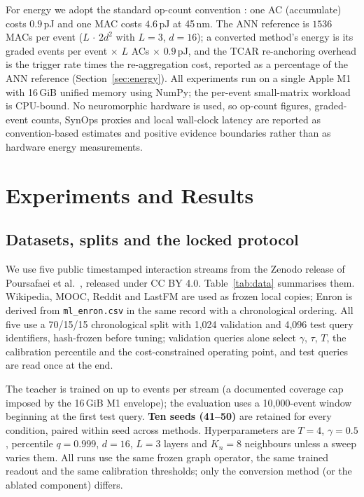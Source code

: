 \documentclass[preprint,12pt]{elsarticle}
\begin{document}
For energy we adopt the standard op-count convention \cite{horowitz2014,zhang2025sgnnbench}: one AC (accumulate) costs $0.9$\,pJ and one MAC costs $4.6$\,pJ at 45\,nm. The ANN reference is $1536$ MACs per event ($L\,{\cdot}\,2d^2$ with $L{=}3$, $d{=}16$); a converted method's energy is its graded events per event $\times$ $L$ ACs $\times$ $0.9$\,pJ, and the TCAR re-anchoring overhead is the trigger rate times the re-aggregation cost, reported as a percentage of the ANN reference (Section~\ref{sec:energy}). All experiments run on a single Apple M1 with 16\,GiB unified memory using NumPy; the per-event small-matrix workload is CPU-bound. No neuromorphic hardware is used, so op-count figures, graded-event counts, SynOps proxies and local wall-clock latency are reported as convention-based estimates and positive evidence boundaries rather than as hardware energy measurements.

\section{Experiments and Results}
\label{sec:results}

\subsection{Datasets, splits and the locked protocol}
\label{sec:setup}

We use five public timestamped interaction streams from the Zenodo release of Poursafaei et al.\ \cite{poursafaei2022dataset,poursafaei2022}, released under CC BY 4.0. Table~\ref{tab:data} summarises them. Wikipedia, MOOC, Reddit and LastFM are used as frozen local copies; Enron is derived from \texttt{ml\_enron.csv} in the same record with a chronological ordering. All five use a 70/15/15 chronological split with 1{,}024 validation and 4{,}096 test query identifiers, hash-frozen before tuning; validation queries alone select $\gamma$, $\tau$, $T$, the calibration percentile and the cost-constrained operating point, and test queries are read once at the end.



The teacher is trained on up to \TrainCoverage{} events per stream (a documented coverage cap imposed by the 16\,GiB M1 envelope); the evaluation uses a 10{,}000-event window beginning at the first test query. \textbf{Ten seeds (41--50)} are retained for every condition, paired within seed across methods. Hyperparameters are $T{=}4$, $\gamma{=}0.5$, percentile $q{=}0.999$, $d{=}16$, $L{=}3$ layers and $K_n{=}8$ neighbours unless a sweep varies them. All runs use the same frozen graph operator, the same trained readout and the same calibration thresholds; only the conversion method (or the ablated component) differs.
\end{document}
